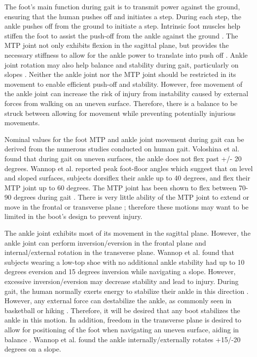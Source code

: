 \documentclass[defaultstyle,11pt]{comps}
\begin{document}
The foot's main function during gait is to transmit power against the ground, ensuring that the human pushes off and initiates a step.
During each step, the ankle pushes off from the ground to initiate a step.
Intrinsic foot muscles help stiffen the foot to assist the push-off from the ankle against the ground \citep{Farris2019}.
The MTP joint not only exhibits flexion in the sagittal plane, but provides the necessary stiffness to allow for the ankle power to translate into push off \citep{Stefanyshyn1997}.
Ankle joint rotation may also help balance and stability during gait, particularly on slopes \citep{Wannop2014}. Neither the ankle joint nor the MTP joint should be restricted in its movement to enable efficient push-off and stability.
However, free movement of the ankle joint can increase the risk of injury from instability caused by external forces from walking on an uneven surface.
Therefore, there is a balance to be struck between allowing for movement while preventing potentially injurious movements.

Nominal values for the foot MTP and ankle joint movement during gait can be derived from the numerous studies conducted on human gait.
Voloshina et al. \citep{Voloshina2013} found that during gait on uneven surfaces, the ankle does not flex past +/- 20 degrees.
Wannop et al. \citep{Wannop2014} reported peak foot-floor angles which suggest that on level and sloped surfaces, subjects dorsiflex their ankle up to 40 degrees, and flex their MTP joint up to 60 degrees.
The MTP joint has been shown to flex between 70-90 degrees during gait \citep{Mann1979}.
There is very little ability of the MTP joint to extend or move in the frontal or transverse plane \citep{Mann1979}; therefore these motions may want to be limited in the boot's design to prevent injury.

The ankle joint exhibits most of its movement in the sagittal plane.
However, the ankle joint can perform inversion/eversion in the frontal plane and internal/external rotation in the transverse plane.
Wannop et al. \citep{Wannop2014} found that subjects wearing a low-top shoe with no additional ankle stability had up to 10 degrees eversion and 15 degrees inversion while navigating a slope.
However, excessive inversion/eversion may decrease stability and lead to injury.
During gait, the human normally exerts energy to stabilize their ankle in this direction \citep{OLoughlin2009}.
However, any external force can destabilize the ankle, as commonly seen in basketball or hiking \citep{Bohm2010}.
Therefore, it will be desired that any boot stabilizes the ankle in this motion.
In addition, freedom in the transverse plane is desired to allow for positioning of the foot when navigating an uneven surface, aiding in balance \citep{Wannop2014, Fraser2016a}.
Wannop et al. \citep{Wannop2014} found the ankle internally/externally rotates +15/-20 degrees on a slope.
\end{document}
